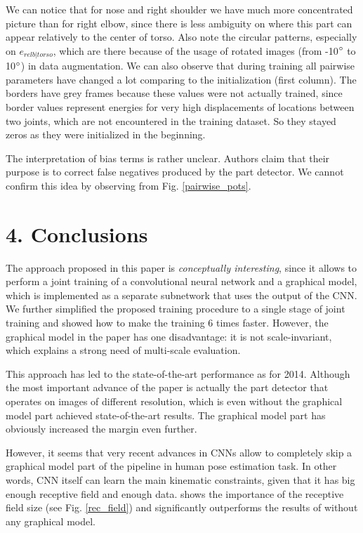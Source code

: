 \documentclass[a4paper,10pt]{article}
\begin{document}
	We can notice that for nose and right shoulder we have much more concentrated picture than for right elbow, since there is less ambiguity on where this part can appear relatively to the center of torso. Also note the circular patterns, especially on $e_{relb | torso}$, which are there because of the usage of rotated images (from -10$\degree$ to 10$\degree$) in data augmentation. We can also observe that during training all pairwise parameters have changed a lot comparing to the initialization (first column). The borders have grey frames because these values were not actually trained, since border values represent energies for very high displacements of locations between two joints, which are not encountered in the training dataset. So they stayed zeros as they were initialized in the beginning.
	
	The interpretation of bias terms is rather unclear. Authors claim that their purpose is to correct false negatives produced by the part detector. We cannot confirm this idea by observing from Fig. \ref{pairwise_pots}.
	
    
    
    
    \section{4. Conclusions}
    The approach proposed in this paper is \textit{conceptually interesting}, since it allows to perform a joint training of a convolutional neural network and a graphical model, which is implemented as a separate subnetwork that uses the output of the CNN. We further simplified the proposed training procedure to a single stage of joint training and showed how to make the training 6 times faster. However, the graphical model in the paper has one disadvantage: it is not scale-invariant, which explains a strong need of multi-scale evaluation.
    
    This approach has led to the state-of-the-art performance as for 2014. Although the most important advance of the paper is actually the part detector that operates on images of different resolution, which is even without the graphical model part achieved state-of-the-art results. The graphical model part has obviously increased the margin even further. 
    
    However, it seems that very recent advances in CNNs allow to completely skip a graphical model part of the pipeline in human pose estimation task. In other words, CNN itself can learn the main kinematic constraints, given that it has big enough receptive field and enough data. \cite{conv_pose_machines} shows the importance of the receptive field size (see Fig. \ref{rec_field}) and significantly outperforms the results of \cite{cnn_pgm_for_hpe} without any graphical model.
    
\end{document}
